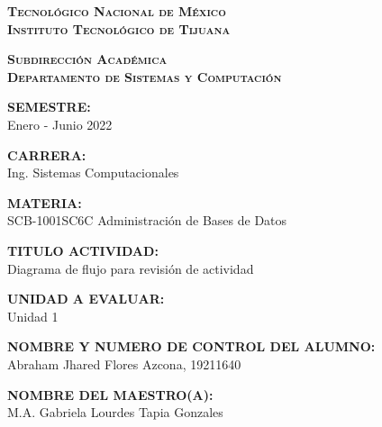 \documentclass[stu, 12pt, letterpaper, donotrepeattitle, floatsintext, natbib]{apa7}
\begin{document}
    \begin{titlepage}
        \thispagestyle{portada}
        \centering
        \vspace*{0.2cm}
        {\large\scshape\bfseries Tecnológico Nacional de México\\Instituto Tecnológico de Tijuana\par}
        \vspace{0.6cm}
        {\normalsize\scshape\bfseries Subdirección Académica\\Departamento de Sistemas y Computación\par}
        \vspace{0.6cm}
        {{\bfseries SEMESTRE:}\\Enero - Junio 2022\par}
        \vspace{\baselineskip}
        {{\bfseries CARRERA:}\\Ing. Sistemas Computacionales\par}
        \vspace{\baselineskip}
        {{\bfseries MATERIA:}\\SCB-1001SC6C Administración de Bases de Datos\par}
        \vspace{\baselineskip}
        {{\bfseries TITULO ACTIVIDAD:}\\Diagrama de flujo para revisión de actividad\par}
        \vspace{\baselineskip}
        {{\bfseries UNIDAD A EVALUAR:}\\Unidad 1 \par}
        \vspace{\baselineskip}
        {{\bfseries NOMBRE Y NUMERO DE CONTROL DEL ALUMNO:}\\Abraham Jhared Flores Azcona, 19211640\par}
        \vspace{\baselineskip}
        {{\bfseries NOMBRE DEL MAESTRO(A):}\\M.A. Gabriela Lourdes Tapia Gonzales\par}
        \vspace{\baselineskip}
    \end{titlepage}

\renewcommand\contentsname{Contenido}
\tableofcontents
\pagebreak
\end{document}
